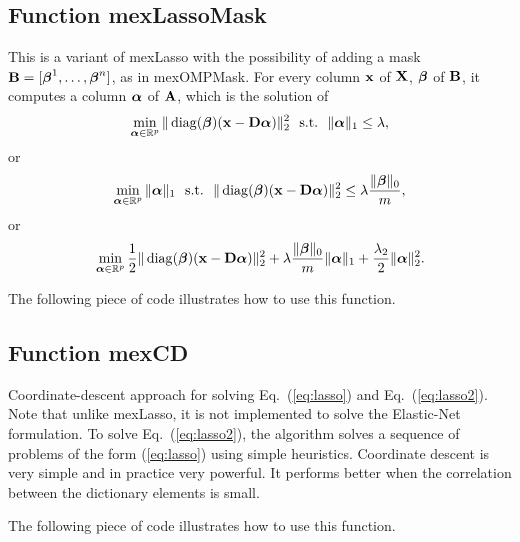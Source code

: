 \documentclass[a4paper, 11pt]{article}
\begin{document}
\subsection{Function mexLassoMask}
This is a variant of mexLasso with the possibility of adding a mask ${\mathbf B}=[{\boldsymbol\beta}^1,\ldots,{\boldsymbol\beta}^n]$, as in mexOMPMask. 
For every column ${\mathbf x}$ of ${\mathbf X}$, ${\boldsymbol\beta}$ of ${\mathbf B}$, it computes a column ${\boldsymbol\alpha}$ of ${\mathbf A}$,  which is the solution of
\begin{equation}
\min_{{\boldsymbol\alpha} \in {\mathbb R}^p} \|\operatorname{diag}({\boldsymbol\beta})({\mathbf x}-{\mathbf D}{\boldsymbol\alpha})\|_2^2 ~~\text{s.t.}~~ \|{\boldsymbol\alpha}\|_1 \leq \lambda,
   \end{equation}
   or 
   \begin{equation}
   \min_{{\boldsymbol\alpha} \in {\mathbb R}^p}  \|{\boldsymbol\alpha}\|_1 ~~\text{s.t.}~~ \|\operatorname{diag}({\boldsymbol\beta})({\mathbf x}-{\mathbf D}{\boldsymbol\alpha})\|_2^2 \leq \lambda\frac{\|{\boldsymbol\beta}\|_0}{m}, 
   \end{equation}
   or
   \begin{equation}
   \min_{{\boldsymbol\alpha} \in {\mathbb R}^p} \frac{1}{2}\|\operatorname{diag}({\boldsymbol\beta})({\mathbf x}-{\mathbf D}{\boldsymbol\alpha})\|_2^2 + \lambda \frac{\|{\boldsymbol\beta}\|_0}{m}\|{\boldsymbol\alpha}\|_1 + \frac{\lambda_2}{2}\|{\boldsymbol\alpha}\|_2^2. 
   \end{equation}

%    

The following piece of code illustrates how to use this function.


\subsection{Function mexCD}
Coordinate-descent approach for solving Eq.~(\ref{eq:lasso}) and
Eq.~(\ref{eq:lasso2}). Note that unlike mexLasso, it is not implemented to solve the Elastic-Net formulation.
To solve Eq.~(\ref{eq:lasso2}), the algorithm solves a
sequence of problems of the form (\ref{eq:lasso}) using simple heuristics.
Coordinate descent is very simple and in practice very powerful. It performs
better when the correlation between the dictionary elements is small. 

%    

The following piece of code illustrates how to use this function.

\end{document}
